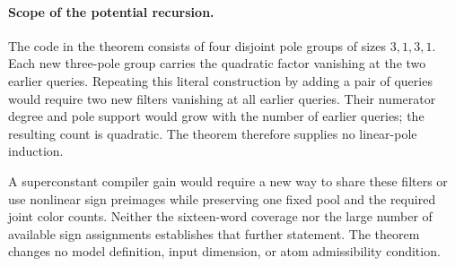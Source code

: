 \documentclass[11pt]{article}
\begin{document}
\paragraph{Scope of the potential recursion.}
The code in the theorem consists of four disjoint pole groups of
sizes $3,1,3,1$. Each new three-pole group carries the quadratic
factor vanishing at the two earlier queries. Repeating this literal
construction by adding a pair of queries would require two new
filters vanishing at all earlier queries. Their numerator degree
and pole support would grow with the number of earlier queries;
the resulting count is quadratic. The theorem therefore supplies
no linear-pole induction.

A superconstant compiler gain would require a new way to share these
filters or use nonlinear sign preimages while preserving one fixed
pool and the required joint color counts. Neither the sixteen-word
coverage nor the large number of available sign assignments establishes
that further statement. The theorem changes no model definition,
input dimension, or atom admissibility condition.
\end{document}

